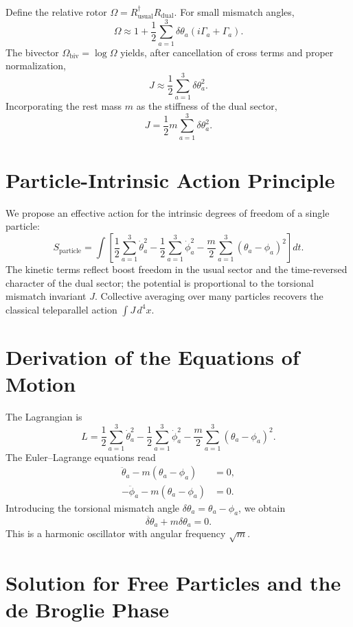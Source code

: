 \documentclass[dvipdfmx,11pt,a4paper]{article}
\begin{document}
Define the relative rotor $\Omega = R_{\text{usual}}^\dagger R_{\text{dual}}$. For small mismatch angles,
\[
\Omega \approx 1 + \frac{1}{2}\sum_{a=1}^3 \delta\theta_a (i\Gamma_a + \Gamma_a).
\]
The bivector $\Omega_{\text{biv}} = \log\Omega$ yields, after cancellation of cross terms and proper normalization,
\[
J \approx \frac{1}{2} \sum_{a=1}^3 \delta\theta_a^2.
\]
Incorporating the rest mass $m$ as the stiffness of the dual sector,
\[
J = \frac{1}{2} m \sum_{a=1}^3 \delta\theta_a^2.
\]

\section{Particle-Intrinsic Action Principle}

We propose an effective action for the intrinsic degrees of freedom of a single particle:
\[
S_{\text{particle}} = \int \left[ \frac{1}{2}\sum_{a=1}^3 \dot{\theta}_a^2 
- \frac{1}{2}\sum_{a=1}^3 \dot{\phi}_a^2 
- \frac{m}{2}\sum_{a=1}^3 (\theta_a - \phi_a)^2 \right] dt.
\]
The kinetic terms reflect boost freedom in the usual sector and the time-reversed character of the dual sector; the potential is proportional to the torsional mismatch invariant $J$. Collective averaging over many particles recovers the classical teleparallel action $\int J\,d^4x$.

\section{Derivation of the Equations of Motion}

The Lagrangian is
\[
L = \frac{1}{2}\sum_{a=1}^3 \dot{\theta}_a^2 
- \frac{1}{2}\sum_{a=1}^3 \dot{\phi}_a^2 
- \frac{m}{2}\sum_{a=1}^3 (\theta_a - \phi_a)^2.
\]
The Euler--Lagrange equations read
\begin{align}
\ddot{\theta}_a - m (\theta_a - \phi_a) &= 0, \\
-\ddot{\phi}_a - m (\theta_a - \phi_a) &= 0.
\end{align}
Introducing the torsional mismatch angle $\delta\theta_a = \theta_a - \phi_a$, we obtain
\begin{equation}
\ddot{\delta\theta}_a + m \delta\theta_a = 0.
\label{eq:harmonic}
\end{equation}
This is a harmonic oscillator with angular frequency $\sqrt{m}$.

\section{Solution for Free Particles and the de Broglie Phase}
\end{document}
